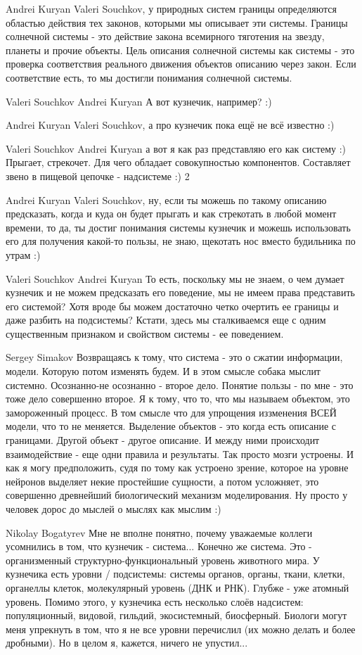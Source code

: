 \documentclass[11pt,a4paper]{article}
\begin{document}
Andrei Kuryan Valeri Souchkov, у природных систем границы определяются
областью действия тех законов, которыми мы описывает эти системы. Границы
солнечной системы - это действие закона всемирного тяготения на звезду,
планеты и прочие объекты. Цель описания солнечной системы как системы - это
проверка соответствия реального движения объектов описанию через закон. Если
соответствие есть, то мы достигли понимания солнечной системы.

Valeri Souchkov Andrei Kuryan А вот кузнечик, например? :)

Andrei Kuryan Valeri Souchkov, а про кузнечик пока ещё не всё известно :)

Valeri Souchkov Andrei Kuryan а вот я как раз представляю его как систему :)
Прыгает, стрекочет. Для чего обладает совокупностью компонентов. Составляет
звено в пищевой цепочке - надсистеме :) 2

Andrei Kuryan Valeri Souchkov, ну, если ты можешь по такому описанию
предсказать, когда и куда он будет прыгать и как стрекотать в любой момент
времени, то да, ты достиг понимания системы кузнечик и можешь использовать его
для получения какой-то пользы, не знаю, щекотать нос вместо будильника по
утрам :)

Valeri Souchkov Andrei Kuryan То есть, поскольку мы не знаем, о чем думает
кузнечик и не можем предсказать его поведение, мы не имеем права представить
его системой? Хотя вроде бы можем достаточно четко очертить ее границы и даже
разбить на подсистемы? Кстати, здесь мы сталкиваемся еще с одним существенным
признаком и свойством системы - ее поведением.

Sergey Simakov Возвращаясь к тому, что система - это о сжатии информации,
модели. Которую потом изменять будем. И в этом смысле собака мыслит
системно. Осознанно-не осознанно - второе дело. Понятие пользы - по мне - это
тоже дело совершенно второе.  Я к тому, что то, что мы называем объектом, это
замороженный процесс. В том смысле что для упрощения иззменения ВСЕЙ модели,
что то не меняется. Выделение объектов - это когда есть описание с
границами. Другой объект - другое описание. И между ними происходит
взаимодействие - еще одни правила и результаты.  Так просто мозги устроены. И
как я могу предположить, судя по тому как устроено зрение, которое на уровне
нейронов выделяет некие простейшие сущности, а потом усложняет, это совершенно
древнейший биологический механизм моделирования.  Ну просто у человек дорос до
мыслей о мыслях как мыслим :)

Nikolay Bogatyrev Мне не вполне понятно, почему уважаемые коллеги усомнились в
том, что кузнечик - система... Конечно же система. Это - организменный
структурно-функциональный уровень животного мира. У кузнечика есть уровни /
подсистемы: системы органов, органы, ткани, клетки, органеллы клеток,
молекулярный уровень (ДНК и РНК). Глубже - уже атомный уровень.  Помимо этого,
у кузнечика есть несколько слоёв надсистем: популяционный, видовой, гильдий,
экосистемный, биосферный. Биологи могут меня упрекнуть в том, что я не все
уровни перечислил (их можно делать и более дробными). Но в целом я, кажется,
ничего не упустил...
\end{document}
